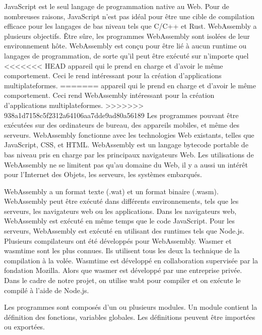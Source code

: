 \documentclass{rapportECL}
\begin{document}
JavaScript est le seul langage de programmation native au Web. 
Pour de nombreuses raisons, JavaScript n’est pas idéal pour être une cible de compilation efficace pour les langages de bas niveau tels que C/C++ et Rust. 
WebAssembly a plusieurs objectifs\cite{haas_bringing_2017}. Être sûre, les programmes WebAssembly sont isolées de leur environnement hôte. 
WebAssembly est conçu pour être lié à aucun runtime ou langages de programmation, de sorte qu'il peut être exécuté sur n'importe quel 
<<<<<<< HEAD
appareil qui le prend en charge et d’avoir le même comportement. Ceci le rend intéressant pour la création d'applications multiplateformes.
=======
appareil qui le prend en charge et d’avoir le même comportement. 
Ceci rend WebAssembly intéressant pour la création d'applications multiplateformes.
>>>>>>> 938a1d7158c5f2312a64106aa7dde9ad80a56189
Les programmes pouvant être exécutées sur des ordinateurs de bureau, des appareils mobiles, et même des serveurs. 
WebAssembly fonctionne avec les technologies Web existants, telles que JavaScript, CSS, et HTML.
WebAssembly est un langage bytecode portable de bas niveau pris en charge par les principaux navigateurs Web. 
Les utilisations de WebAssembly ne se limitent pas qu'au domaine du Web, il y a aussi un intérêt pour l'Internet des Objets, les serveurs, les systèmes embarqués.
\par WebAssembly a un format texte (.wat) et un format binaire (.wasm). 
WebAssembly peut être exécuté dans différents environnements, tels que les serveurs, les navigateurs web ou les applications. 
Dans les navigateurs web, WebAssembly est exécuté en même temps que le code JavaScript. 
Pour les serveurs, WebAssembly est exécuté en utilisant des runtimes tels que Node.js. 
Plusieurs compilateurs ont été développés pour WebAssembly\cite{noauthor_wabt_2023,noauthor_wasm3_2023,noauthor_wasmer_nodate,noauthor_wasmtime_nodate}. 
Wasmer\cite{noauthor_wasmer_nodate} et wasmtime\cite{noauthor_wasmtime_nodate} sont les plus connues. 
Ils utilisent tous les deux la technique de la compilation à la volée. Wasmtime est développé en collaboration supervisée par la fondation Mozilla. 
Alors que wasmer est développé par une entreprise privée. 
Dans le cadre de notre projet, on utilise wabt\cite{noauthor_wabt_2023} pour compiler et on exécute le compilé à l’aide de Node.js\cite{noauthor_nodejs_nodate}. 
\par Les programmes sont composés d'un ou plusieurs modules. Un module contient la définition des fonctions, variables globales. 
Les définitions peuvent être importées ou exportées.
\end{document}
